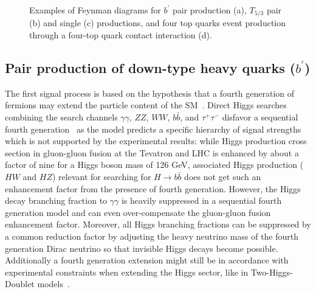 \begin{figure}[t]
\caption{Examples of Feynman diagrams for $b^\prime$ pair production (a), $T_{5/3}$ pair (b) and
single (c) productions, and four top quarks event production through a four-top quark contact interaction (d).}
\end{figure}

\subsection{Pair production of down-type heavy quarks ($b^\prime$)}
The first signal process is based on the hypothesis that a fourth
generation of fermions may extend the particle content of the
SM~\cite{Holdom:2006mr}. Direct Higgs searches combining the search
channels $\gamma \gamma$, $ZZ$, $WW$, $b\bar{b}$, and $\tau^{+}
\tau^{-}$ disfavor a sequential fourth
generation~\cite{Eberhardt:2012gv,Djouadi:2012ae,Eberhardt:2012sb,Eberhardt:2012ck}
as the model predicts a specific hierarchy of signal strengths which
is not supported by the experimental results: while Higgs production
cross section in gluon-gluon fusion at the Tevatron and LHC is
enhanced by about a factor of nine for a Higgs boson mass of 126 GeV,
associated Higgs production ($HW$ and $HZ$) relevant for searching for
$H \rightarrow b\bar{b}$ does not get such an enhancement factor from
the presence of fourth generation. However, the Higgs decay branching fraction
to $\gamma \gamma$ is heavily suppressed in a sequential fourth
generation model and can even over-compensate the gluon-gluon fusion
enhancement factor. Moreover, all Higgs branching fractions can be suppressed by
a common reduction factor by adjusting the heavy neutrino mass of the
fourth generation Dirac neutrino so that invisible Higgs decays become
possible. Additionally a fourth generation extension might still be in accordance
with experimental constraints when extending the Higgs sector, like in
Two-Higgs-Doublet models~\cite{BarShalom:2012ms}.

